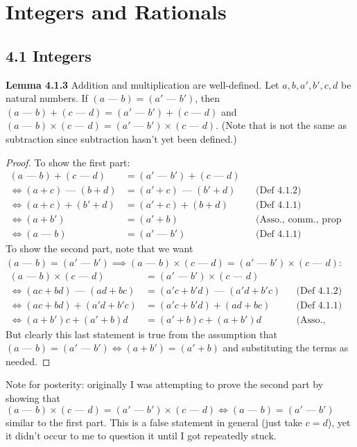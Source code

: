 \documentclass[answers,12pt]{exam}
\newcommand{\fakeminus}{\text{ --- }}
\begin{document}
\section{Integers and Rationals}
\subsection{4.1 Integers}
\textbf{Lemma 4.1.3} Addition and multiplication are well-defined.
Let $a,b,a',b',c,d$ be natural numbers.
If $(a \fakeminus b)=(a' \fakeminus b')$, then $(a \fakeminus b)+(c \fakeminus d)=(a' \fakeminus b')+(c \fakeminus d)$ and $(a \fakeminus b)\times(c \fakeminus d)=(a' \fakeminus b')\times(c \fakeminus d)$.
(Note that \fakeminus{} is not the same as subtraction since subtraction hasn't yet been defined.)

\begin{solution}
\begin{proof}
    To show the first part:
    \begin{align*}
        (a \fakeminus b) + (c \fakeminus d) &= (a' \fakeminus b') + (c \fakeminus d)\\
        \iff (a+c) \fakeminus (b+d) &= (a' + c) \fakeminus (b' + d) && \text{(Def 4.1.2)}\\
        \iff (a+c) + (b'+d) &= (a' + c) + (b + d)  && \text{(Def 4.1.1)}\\
        \iff (a+b') &= (a'+b)  && \text{(Asso., comm., prop 2.2.6)}\\
        \iff (a \fakeminus b) &= (a' \fakeminus b')  && \text{(Def 4.1.1)}
    \end{align*}
    To show the second part, note that we want $(a \fakeminus b) = (a' \fakeminus b') \implies (a \fakeminus b) \times (c \fakeminus d)  = (a' \fakeminus b') \times (c \fakeminus d)$:
    \begin{align*}
        (a \fakeminus b) \times (c \fakeminus d) &= (a' \fakeminus b') \times (c \fakeminus d) \\
        \iff (ac + bd) \fakeminus (ad + bc) &= (a'c + b'd) \fakeminus (a'd + b'c)&& \text{(Def 4.1.2)} \\
        \iff (ac + bd) + (a'd + b'c) &= (a'c + b'd) + (ad + bc) && \text{(Def 4.1.1)}\\
        \iff (a+b')c + (a'+b)d &= (a'+b)c + (a+b')d && \text{(Asso., comm., dist.)}
    \end{align*}
    But clearly this last statement is true from the assumption that $(a \fakeminus b) = (a' \fakeminus b') \iff (a + b') = (a' + b)$ and substituting the terms as needed.
\end{proof}

Note for posterity: originally I was attempting to prove the second part by showing that $(a \fakeminus b) \times (c \fakeminus d) = (a' \fakeminus b') \times (c \fakeminus d) \iff (a \fakeminus b) = (a' \fakeminus b')$ similar to the first part.
This is a false statement in general (just take $c = d$), yet it didn't occur to me to question it until I got repeatedly stuck.
\end{solution}
\end{document}
